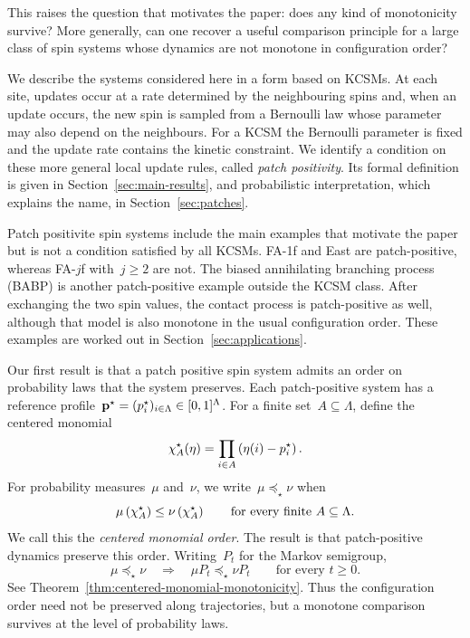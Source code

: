 \documentclass[EJP,preprint,NODS,nobera]{ejpecp}
\begin{document}
This raises the question that motivates the paper: does any kind of monotonicity survive? More generally, can one recover a useful comparison principle for a large class of
spin systems whose dynamics are not monotone in configuration order?

We describe the systems considered here in a form based on KCSMs. At each
site, updates occur at a rate determined by the neighbouring spins and, when an
update occurs, the new spin is sampled from a Bernoulli law whose parameter may
also depend on the neighbours. For a KCSM the Bernoulli parameter is fixed and
the update rate contains the kinetic constraint. We identify a condition on
these more general local update rules, called \emph{patch positivity}. Its
formal definition is given in Section~\ref{sec:main-results}, and probabilistic interpretation, which explains the name, in Section~\ref{sec:patches}.

Patch positivite spin systems include the main examples that motivate the paper but is not
a condition satisfied by all KCSMs. FA-1f and East are patch-positive, whereas
FA-$j$f with~$j\geq2$ are not. The biased annihilating branching process
(BABP) is another patch-positive example outside the KCSM class. After
exchanging the two spin values, the contact process is patch-positive as well,
although that model is also monotone in the usual configuration order. These examples are worked out in
Section~\ref{sec:applications}.

Our first result is that a patch positive spin system admits an order on
probability laws that the system preserves. Each patch-positive system has
a reference profile~$\mathbf{p}^\star=(p_i^\star)_{i\in\Lambda} \in [0,1]^\Lambda$. For a finite
set~$A\subseteq\Lambda$, define the centered monomial
\begin{equation*}
\chi_A^\star(\eta)
=
\prod_{i\in A}\left(\eta(i)-p_i^\star\right).
\end{equation*}
For probability measures~$\mu$ and~$\nu$, we write~$\mu\preceq_\star\nu$
when
\begin{equation*}
\mu\left(\chi_A^\star\right)
\leq
\nu\left(\chi_A^\star\right)
\qquad
\text{for every finite }A\subseteq\Lambda.
\end{equation*}
We call this the \emph{centered monomial order}. The result is that patch-positive dynamics preserve this order.
Writing~$P_t$ for the Markov semigroup,
\begin{equation*}
\mu\preceq_\star\nu
\quad\Longrightarrow\quad
\mu P_t\preceq_\star\nu P_t
\qquad
\text{for every }t\geq0.
\end{equation*}
See Theorem~\ref{thm:centered-monomial-monotonicity}. Thus the configuration
order need not be preserved along trajectories, but a monotone comparison
survives at the level of probability laws.
\end{document}
